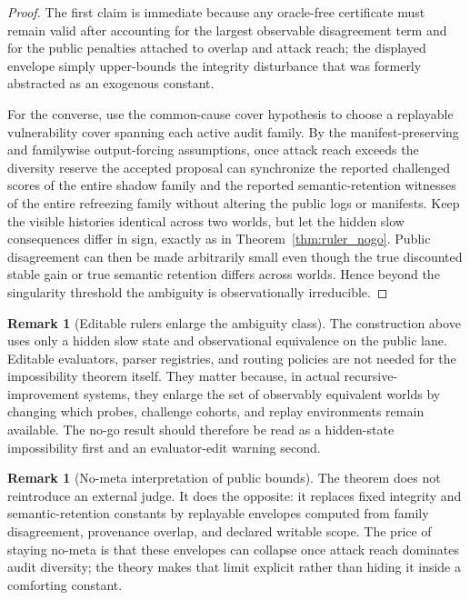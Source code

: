 \documentclass[11pt]{article}
\theoremstyle{definition}
\newtheorem{remark}[theorem]{Remark}
\newcommand{\1}{\mathbf{1}}
\begin{document}
\begin{proof}
The first claim is immediate because any oracle-free certificate must remain valid after accounting for the largest observable disagreement term and for the public penalties attached to overlap and attack reach; the displayed envelope simply upper-bounds the integrity disturbance that was formerly abstracted as an exogenous constant.

For the converse, use the common-cause cover hypothesis to choose a replayable vulnerability cover spanning each active audit family. By the manifest-preserving and familywise output-forcing assumptions, once attack reach exceeds the diversity reserve the accepted proposal can synchronize the reported challenged scores of the entire shadow family and the reported semantic-retention witnesses of the entire refreezing family without altering the public logs or manifests. Keep the visible histories identical across two worlds, but let the hidden slow consequences differ in sign, exactly as in Theorem~\ref{thm:ruler_nogo}. Public disagreement can then be made arbitrarily small even though the true discounted stable gain or true semantic retention differs across worlds. Hence beyond the singularity threshold the ambiguity is observationally irreducible.
\end{proof}

\begin{remark}[Editable rulers enlarge the ambiguity class]\label{rem:ruler_nogo_scope}
The construction above uses only a hidden slow state and observational equivalence on the public lane. Editable evaluators, parser registries, and routing policies are not needed for the impossibility theorem itself. They matter because, in actual recursive-improvement systems, they enlarge the set of observably equivalent worlds by changing which probes, challenge cohorts, and replay environments remain available. The no-go result should therefore be read as a hidden-state impossibility first and an evaluator-edit warning second.
\end{remark}

\begin{remark}[No-meta interpretation of public bounds]
The theorem does not reintroduce an external judge. It does the opposite: it replaces fixed integrity and semantic-retention constants by replayable envelopes computed from family disagreement, provenance overlap, and declared writable scope. The price of staying no-meta is that these envelopes can collapse once attack reach dominates audit diversity; the theory makes that limit explicit rather than hiding it inside a comforting constant.
\end{remark}
\end{document}
